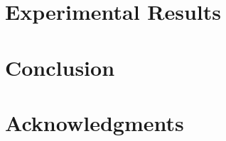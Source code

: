 \documentclass[journal]{IEEEtran}
\begin{document}
  \section{Experimental Results} 
  

  \section{Conclusion} 
  

  \vspace{5em}
  \section*{Acknowledgments}
  

  \begingroup
  \setlength\bibitemsep{1pt}
  \printbibliography
  \endgroup

  \appendix
  
\end{document}
